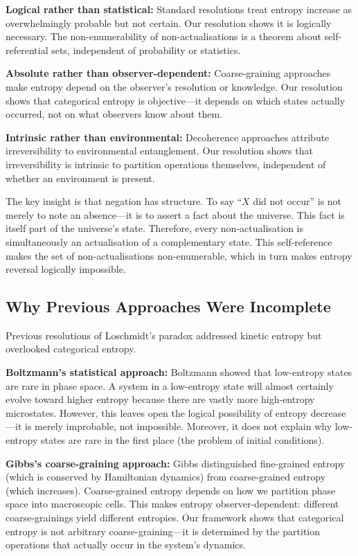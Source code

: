 \documentclass[twocolumn,10pt]{article}
\theoremstyle{definition}
\theoremstyle{remark}
\begin{document}
\textbf{Logical rather than statistical:} Standard resolutions treat entropy increase as overwhelmingly probable but not certain. Our resolution shows it is logically necessary. The non-enumerability of non-actualisations is a theorem about self-referential sets, independent of probability or statistics.

\textbf{Absolute rather than observer-dependent:} Coarse-graining approaches make entropy depend on the observer's resolution or knowledge. Our resolution shows that categorical entropy is objective—it depends on which states actually occurred, not on what observers know about them.

\textbf{Intrinsic rather than environmental:} Decoherence approaches attribute irreversibility to environmental entanglement. Our resolution shows that irreversibility is intrinsic to partition operations themselves, independent of whether an environment is present.

The key insight is that negation has structure. To say ``$X$ did not occur'' is not merely to note an absence—it is to assert a fact about the universe. This fact is itself part of the universe's state. Therefore, every non-actualisation is simultaneously an actualisation of a complementary state. This self-reference makes the set of non-actualisations non-enumerable, which in turn makes entropy reversal logically impossible.

\subsection{Why Previous Approaches Were Incomplete}

Previous resolutions of Loschmidt's paradox addressed kinetic entropy but overlooked categorical entropy.

\textbf{Boltzmann's statistical approach:} Boltzmann showed that low-entropy states are rare in phase space. A system in a low-entropy state will almost certainly evolve toward higher entropy because there are vastly more high-entropy microstates. However, this leaves open the logical possibility of entropy decrease—it is merely improbable, not impossible. Moreover, it does not explain why low-entropy states are rare in the first place (the problem of initial conditions).

\textbf{Gibbs's coarse-graining approach:} Gibbs distinguished fine-grained entropy (which is conserved by Hamiltonian dynamics) from coarse-grained entropy (which increases). Coarse-grained entropy depends on how we partition phase space into macroscopic cells. This makes entropy observer-dependent: different coarse-grainings yield different entropies. Our framework shows that categorical entropy is not arbitrary coarse-graining—it is determined by the partition operations that actually occur in the system's dynamics.
\end{document}
